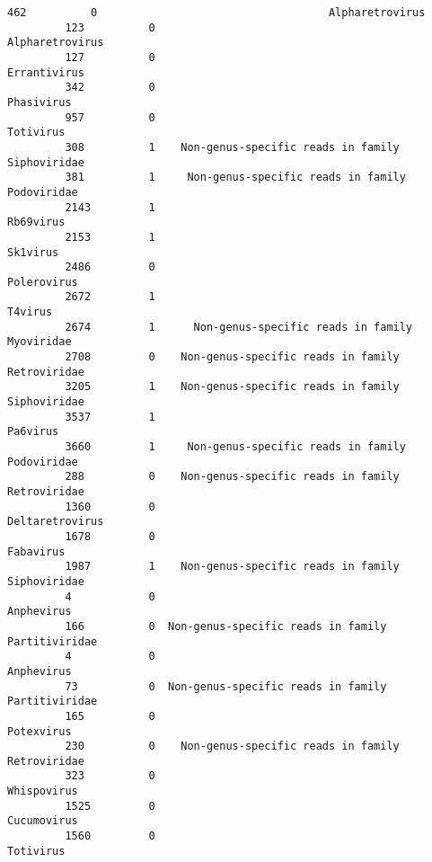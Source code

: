 \documentclass[11pt]{article}
\begin{document}
\begin{Verbatim}[commandchars=\\\{\}]
         462          0                                    Alpharetrovirus   
         123          0                                    Alpharetrovirus   
         127          0                                       Errantivirus   
         342          0                                         Phasivirus   
         957          0                                          Totivirus   
         308          1    Non-genus-specific reads in family Siphoviridae   
         381          1     Non-genus-specific reads in family Podoviridae   
         2143         1                                          Rb69virus   
         2153         1                                           Sk1virus   
         2486         0                                        Polerovirus   
         2672         1                                            T4virus   
         2674         1      Non-genus-specific reads in family Myoviridae   
         2708         0    Non-genus-specific reads in family Retroviridae   
         3205         1    Non-genus-specific reads in family Siphoviridae   
         3537         1                                           Pa6virus   
         3660         1     Non-genus-specific reads in family Podoviridae   
         288          0    Non-genus-specific reads in family Retroviridae   
         1360         0                                    Deltaretrovirus   
         1678         0                                          Fabavirus   
         1987         1    Non-genus-specific reads in family Siphoviridae   
         4            0                                         Anphevirus   
         166          0  Non-genus-specific reads in family Partitiviridae   
         4            0                                         Anphevirus   
         73           0  Non-genus-specific reads in family Partitiviridae   
         165          0                                         Potexvirus   
         230          0    Non-genus-specific reads in family Retroviridae   
         323          0                                        Whispovirus   
         1525         0                                        Cucumovirus   
         1560         0                                          Totivirus   
         

\end{Verbatim}
\end{document}
